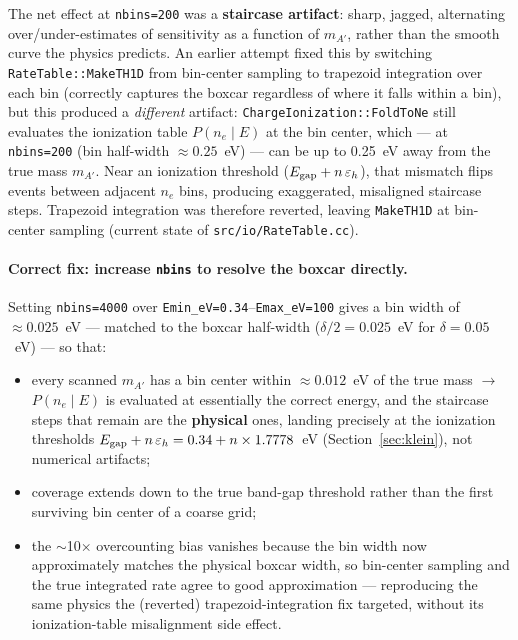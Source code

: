 The net effect at \texttt{nbins=200} was a \textbf{staircase artifact}:
sharp, jagged, alternating over/under-estimates of sensitivity as a
function of $m_{A'}$, rather than the smooth curve the physics predicts. An
earlier attempt fixed this by switching \texttt{RateTable::MakeTH1D} from
bin-center sampling to trapezoid integration over each bin (correctly
captures the boxcar regardless of where it falls within a bin), but this
produced a \emph{different} artifact: \texttt{ChargeIonization::FoldToNe}
still evaluates the ionization table $P(n_e\mid E)$ at the bin center,
which — at \texttt{nbins=200} (bin half-width $\approx0.25$~eV) — can be up
to 0.25~eV away from the true mass $m_{A'}$. Near an ionization threshold
($E_\mathrm{gap} + n\,\varepsilon_h$), that mismatch flips events between adjacent $n_e$
bins, producing exaggerated, misaligned staircase steps. Trapezoid
integration was therefore reverted, leaving \texttt{MakeTH1D} at bin-center
sampling (current state of \texttt{src/io/RateTable.cc}).

\paragraph{Correct fix: increase \texttt{nbins} to resolve the boxcar
directly.} Setting \texttt{nbins=4000} over
\texttt{Emin\_eV=0.34}--\texttt{Emax\_eV=100} gives a bin width of
$\approx0.025$~eV — matched to the boxcar half-width
($\delta/2=0.025$~eV for $\delta=0.05$~eV) — so that:
\begin{itemize}[leftmargin=*]
  \item every scanned $m_{A'}$ has a bin center within $\approx0.012$~eV of
  the true mass $\to$ $P(n_e\mid E)$ is evaluated at essentially the
  correct energy, and the staircase steps that remain are the
  \textbf{physical} ones, landing precisely at the ionization thresholds
  $E_\mathrm{gap} + n\,\varepsilon_h = 0.34 + n\times1.7778$~eV (Section~\ref{sec:klein}),
  not numerical artifacts;
  \item coverage extends down to the true band-gap threshold rather than
  the first surviving bin center of a coarse grid;
  \item the $\sim$10$\times$ overcounting bias vanishes because the bin
  width now approximately matches the physical boxcar width, so
  bin-center sampling and the true integrated rate agree to good
  approximation — reproducing the same physics the (reverted)
  trapezoid-integration fix targeted, without its ionization-table
  misalignment side effect.
\end{itemize}

